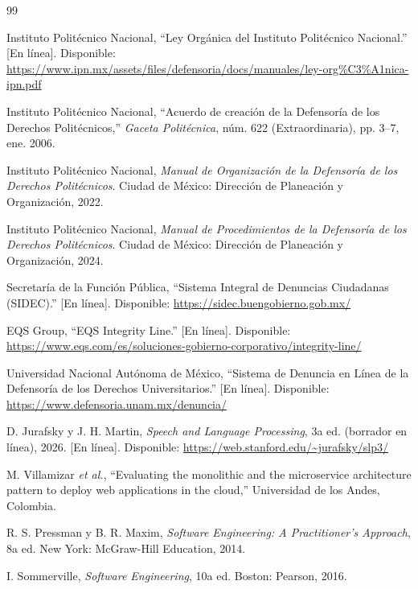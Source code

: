 \documentclass[conference,letterpaper]{IEEEtran}
\begin{document}
\begin{thebibliography}{99}

Instituto Politécnico Nacional, ``Ley Orgánica del Instituto Politécnico Nacional.'' [En línea]. Disponible: \url{https://www.ipn.mx/assets/files/defensoria/docs/manuales/ley-org\%C3\%A1nica-ipn.pdf}

Instituto Politécnico Nacional, ``Acuerdo de creación de la Defensoría de los Derechos Politécnicos,'' \emph{Gaceta Politécnica}, núm. 622 (Extraordinaria), pp. 3--7, ene. 2006.

Instituto Politécnico Nacional, \emph{Manual de Organización de la Defensoría de los Derechos Politécnicos}. Ciudad de México: Dirección de Planeación y Organización, 2022.

Instituto Politécnico Nacional, \emph{Manual de Procedimientos de la Defensoría de los Derechos Politécnicos}. Ciudad de México: Dirección de Planeación y Organización, 2024.

Secretaría de la Función Pública, ``Sistema Integral de Denuncias Ciudadanas (SIDEC).'' [En línea]. Disponible: \url{https://sidec.buengobierno.gob.mx/}

EQS Group, ``EQS Integrity Line.'' [En línea]. Disponible: \url{https://www.eqs.com/es/soluciones-gobierno-corporativo/integrity-line/}

Universidad Nacional Autónoma de México, ``Sistema de Denuncia en Línea de la Defensoría de los Derechos Universitarios.'' [En línea]. Disponible: \url{https://www.defensoria.unam.mx/denuncia/}

D. Jurafsky y J. H. Martin, \emph{Speech and Language Processing}, 3a ed. (borrador en línea), 2026. [En línea]. Disponible: \url{https://web.stanford.edu/~jurafsky/slp3/}

M. Villamizar \emph{et al.}, ``Evaluating the monolithic and the microservice architecture pattern to deploy web applications in the cloud,'' Universidad de los Andes, Colombia.

R. S. Pressman y B. R. Maxim, \emph{Software Engineering: A Practitioner's Approach}, 8a ed. New York: McGraw-Hill Education, 2014.

I. Sommerville, \emph{Software Engineering}, 10a ed. Boston: Pearson, 2016.


\end{thebibliography}
\end{document}
